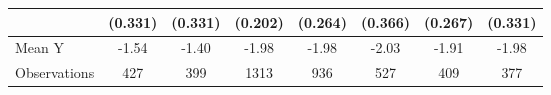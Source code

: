 {\begin{tabular}{l*{7}{c}}
            &     (0.331)         &     (0.331)         &     (0.202)         &     (0.264)         &     (0.366)         &     (0.267)         &     (0.331)         \\
\midrule
Mean Y      &       -1.54         &       -1.40         &       -1.98         &       -1.98         &       -2.03         &       -1.91         &       -1.98         \\
Observations&         427         &         399         &        1313         &         936         &         527         &         409         &         377         \\
\bottomrule
\end{tabular}
}
